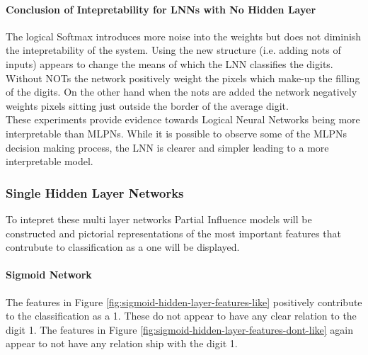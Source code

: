 \paragraph{Conclusion of Intepretability for LNNs with No Hidden Layer}
The logical Softmax introduces more noise into the weights but does not diminish the intepretability of the system. Using the new structure (i.e. adding nots of inputs) appears to change the means of which the LNN classifies the digits. Without NOTs the network positively weight the pixels which make-up the filling of the digits. On the other hand when the nots are added the network negatively weights pixels sitting just outside the border of the average digit.\\

These experiments provide evidence towards Logical Neural Networks being more interpretable than MLPNs. While it is possible to observe some of the MLPNs decision making process, the LNN is clearer and simpler leading to a more interpretable model.

\subsubsection{Single Hidden Layer Networks}
To intepret these multi layer networks Partial Influence models will be constructed and pictorial representations of the most important features that contrubute to classification as a one will be displayed.

\paragraph{Sigmoid Network}
	The features in Figure \ref{fig:sigmoid-hidden-layer-features-like} positively contribute to the classification as a 1. These do not appear to have any clear relation to the digit 1. The features in Figure \ref{fig:sigmoid-hidden-layer-features-dont-like} again appear to not have any relation ship with the digit 1.

